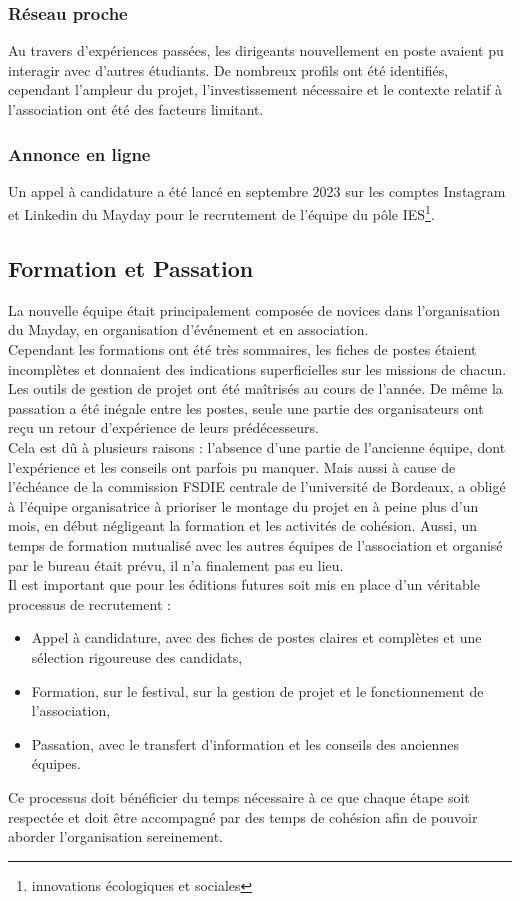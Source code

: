 \documentclass[12pt,a4paper]{report}
\begin{document}
\subsubsection{Réseau proche}
Au travers d'expériences passées, les dirigeants nouvellement en poste avaient pu interagir avec d'autres étudiants. De nombreux profils ont été identifiés, cependant l'ampleur du projet, l'investissement nécessaire  et le contexte relatif à l'association ont été des facteurs limitant.

\subsubsection{Annonce en ligne}
Un appel à candidature a été lancé en septembre 2023 sur les comptes Instagram et Linkedin du Mayday pour le recrutement de l’équipe du pôle IES\footnote{innovations écologiques et sociales}.

\subsection{Formation et Passation}

La nouvelle équipe était principalement composée de novices dans l’organisation du Mayday, en organisation d’événement et en association.\\

Cependant les formations ont été très sommaires, les fiches de postes étaient incomplètes et donnaient des indications superficielles sur les missions de chacun. Les outils de gestion de projet ont été maîtrisés au cours de l’année. De même la passation a été inégale entre les postes, seule une partie des organisateurs ont reçu un retour d’expérience de leurs prédécesseurs.\\

Cela est dû à plusieurs raisons : l’absence d’une partie de l’ancienne équipe, dont l’expérience et les conseils ont parfois pu manquer. Mais aussi à cause de l’échéance de la commission FSDIE centrale de l’université de Bordeaux, a obligé à l’équipe organisatrice à prioriser le montage du projet en à peine plus d’un mois, en début négligeant la formation et les activités de cohésion. Aussi, un temps de formation mutualisé avec les autres équipes de l’association et organisé par le bureau était prévu, il n’a finalement pas eu lieu.\\

Il est important que pour les éditions futures soit mis en place d’un véritable processus de recrutement :
\begin{itemize}
\item Appel à candidature, avec des fiches de postes claires et complètes et une sélection rigoureuse des candidats,
\item Formation, sur le festival, sur la gestion de projet et le fonctionnement de l’association,
\item Passation, avec le transfert d’information et les conseils des anciennes équipes.\\
\end{itemize}
Ce processus doit bénéficier du temps nécessaire à ce que chaque étape soit respectée et doit être accompagné par des temps de cohésion afin de pouvoir aborder l’organisation sereinement.
\end{document}

